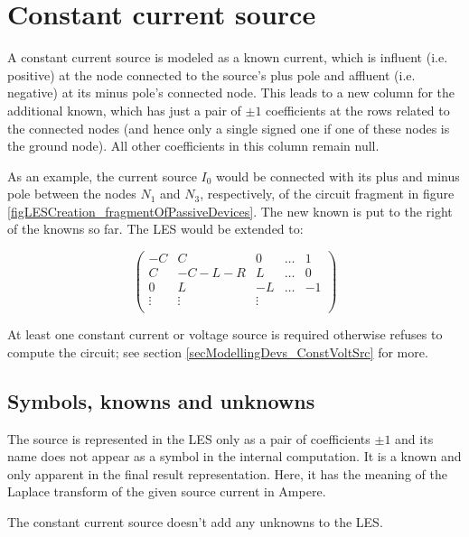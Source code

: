 \section{Constant current source}

A constant current source is modeled as a known current, which is
influent (i.e. positive) at the node connected to the source's plus pole
and affluent (i.e. negative) at its minus pole's connected node. This
leads to a new column for the additional known, which has just a pair of
$\pm 1$ coefficients at the rows related to the connected nodes (and hence
only a single signed one if one of these nodes is the ground node). All
other coefficients in this column remain null.

As an example, the current source $I_0$ would be connected with its plus
and minus pole between the nodes $N_1$ and $N_3$, respectively, of the
circuit fragment in figure \ref{figLESCreation_fragmentOfPassiveDevices}.
The new known is put to the right of the knowns so far. The LES would be
extended to:

\begin{displaymath}
\left(
\begin{array}{ccccc}
-C      & C      &  0     & \ldots & 1  \\
 C      & -C-L-R &  L     & \ldots & 0  \\
 0      &    L   & -L     & \ldots & -1 \\
 \vdots & \vdots & \vdots &        &    \\
\end{array}
\right)
\end{displaymath}

At least one constant current or voltage source is required otherwise
\linnet{} refuses to compute the circuit; see section
\ref{secModellingDevs_ConstVoltSrc} for more.


\subsection{Symbols, knowns and unknowns}

The source is represented in the LES only as a pair of coefficients $\pm
1$ and its name does not appear as a symbol in the internal computation.
It is a known and only apparent in the final result representation. Here,
it has the meaning of the Laplace transform of the given source current in
Ampere.

The constant current source doesn't add any unknowns to the LES.


